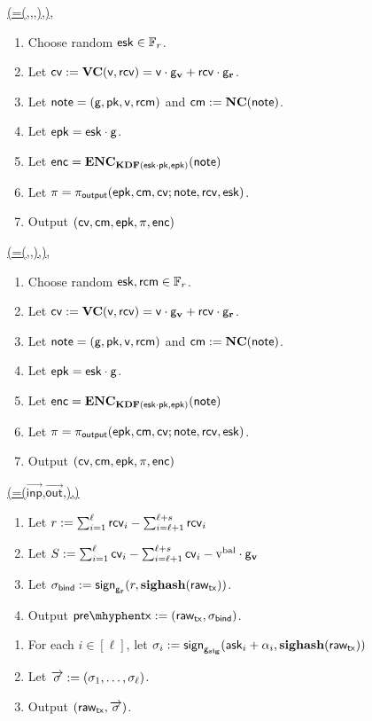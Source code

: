 \documentclass[11pt]{article}
\numberwithin{equation}{section} %
\numberwithin{figure}{section} %
\newcommand{\inp}{\ensuremath{\mathsf{inp}}\xspace}
\newcommand{\inps}{\ensuremath{\overrightarrow{\mathsf{inp}}}\xspace}
\newcommand{\outs}{\ensuremath{\overrightarrow{\mathsf{out}}}\xspace}
\begin{document}
\noindent
\underline{\makeoutput(\note=(\gd,\pk,\val,\rcm),\rcv)},
\begin{enumerate}
 \item Choose random $\mathsf{esk}\in {\mathbb F}_r$.
 \item Let $\mathsf{cv}:= \mathbf{VC}(\mathsf{v},\mathsf{rcv}) = \mathsf{v}\cdot \mathsf{g}_{\mathbf{v}} + \mathsf{rcv}\cdot \mathsf{g}_\mathbf{r}$.
 \item Let $\mathsf{note} = (\mathsf{g},\mathsf{pk},\mathsf{v},\mathsf{rcm})$ and $\mathsf{cm}:= \mathbf{NC}(\mathsf{note})$.
 \item Let $\mathsf{epk} = \mathsf{esk}\cdot \mathsf{g}$.
 \item Let $\mathsf{enc} = \mathbf{ENC}_{\mathbf{KDF}(\mathsf{esk}\cdot \mathsf{pk},\mathsf{epk})}(\mathsf{note})$
 \item Let $\pi = \pi_{\mathsf{output}}(\mathsf{epk},\mathsf{cm},\mathsf{cv};\mathsf{note},\mathsf{rcv},\mathsf{esk})$.
 \item Output $(\mathsf{cv},\mathsf{cm},\mathsf{epk},\pi,\mathsf{enc})$
\end{enumerate}
\noindent
\underline{\makerandomizedoutput(\note=(\gd,\pk,\val),\rcv)},
\begin{enumerate}
 \item Choose random $\mathsf{esk},\mathsf{rcm}\in {\mathbb F}_r$.
 \item Let $\mathsf{cv}:= \mathbf{VC}(\mathsf{v},\mathsf{rcv}) = \mathsf{v}\cdot \mathsf{g}_{\mathbf{v}} + \mathsf{rcv}\cdot \mathsf{g}_\mathbf{r}$.
 \item Let $\mathsf{note} = (\mathsf{g},\mathsf{pk},\mathsf{v},\mathsf{rcm})$ and $\mathsf{cm}:= \mathbf{NC}(\mathsf{note})$.
 \item Let $\mathsf{epk} = \mathsf{esk}\cdot \mathsf{g}$.
 \item Let $\mathsf{enc} = \mathbf{ENC}_{\mathbf{KDF}(\mathsf{esk}\cdot \mathsf{pk},\mathsf{epk})}(\mathsf{note})$
 \item Let $\pi = \pi_{\mathsf{output}}(\mathsf{epk},\mathsf{cm},\mathsf{cv};\mathsf{note},\mathsf{rcv},\mathsf{esk})$.
 \item Output $(\mathsf{cv},\mathsf{cm},\mathsf{epk},\pi,\mathsf{enc})$
\end{enumerate}
\noindent
\underline{\bindvaltx(\rawtx=(\inps,\outs,\vbal),\rcvs)}

\begin{enumerate}
 \item Let $r:=\sum_{i=1}^\ell \mathsf{rcv}_i - \sum_{i=\ell+1}^{\ell+s}\mathsf{rcv}_i$
 \item Let $S:=\sum_{i=1}^\ell \mathsf{cv}_i - \sum_{i=\ell+1}^{\ell+s}\mathsf{cv}_i-\mathrm{v^{bal}}\cdot \mathsf{g}_{\mathbf{v}}$
 \item Let $\sigma_{\mathsf{bind}} := \mathsf{sign}_{\mathsf{g}_\mathbf{r}}(r,\mathbf{sighash}(\mathsf{raw_{tx}}))$.
 \item Output $\pretx\defeq (\rawtx,\sigval)$.
\end{enumerate}

\noindent
\underline{\signtx{\pretx=(\rawtx,\sigval),\asks,\alphas}}
\begin{enumerate}
 \item For each $i\in [\ell]$, let $\sigma_i:= \mathsf{sign}_{\mathsf{g}_{\mathbf{sig}}}(\mathsf{ask}_i+\alpha_i,\mathbf{sighash}(\mathsf{raw_{tx}}))$
 \item Let $\overrightarrow{\mathsf{\sigma}}:= (\sigma_1,\ldots,\sigma_\ell)$.
 \item Output $(\mathsf{raw_{tx}},\overrightarrow{\mathsf{\sigma}})$.
\end{enumerate}
\end{document}

